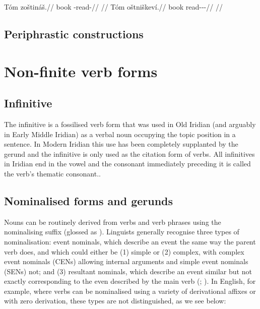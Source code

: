 \begin{multicols}{2}
  \pex
  \a
  \begingl
  \gla Tóm zoštináš.//
  \glb book \Neg{}-read-\SupN{}//
  \glft {}//
  \endgl
  \a \begingl
  \gla Tóm oštniškeví.//
  \glb book read-\Pv{}-\Deb{}-\Cont{}//
  \glft {}//
  \endgl
  \xe
\end{multicols}

\subsection{Periphrastic constructions}

\section{Non-finite verb forms}

\subsection{Infinitive}\label{sec:infinitive}

The {\cscaps infinitive} is a fossilised verb form that was used in Old Iridian (and arguably in Early Middle Iridian) as a verbal noun occupying the topic position in a sentence. In Modern Iridian this use has been completely supplanted by the gerund and the infinitive is only used as the citation form of verbs. All infinitives in Iridian end in the vowel  and the consonant immediately preceding it is called the verb's thematic consonant..

\subsection{Nominalised forms and gerunds}\label{nom-morph}

Nouns can be routinely derived from verbs and verb phrases using the nominalising suffix  (glossed as \Nz{}). Linguists generally recognise three types of nominalisation: event nominals, which describe an event the same way the parent verb does, and which could either be (1) simple or (2) complex, with {\cscaps complex event nominals} (CENs) allowing internal arguments and {\cscaps simple event nominals} (SENs) not; and (3) {\cscaps resultant nominals}, which describe an event similar but not exactly corresponding to the even described by the main verb (\cite{grimshaw1990}; \cite{moulton2014}). In English, for example, where verbs can be nominalised using a variety of derivational affixes or with zero derivation, these types are not distinguished, as we see below:

